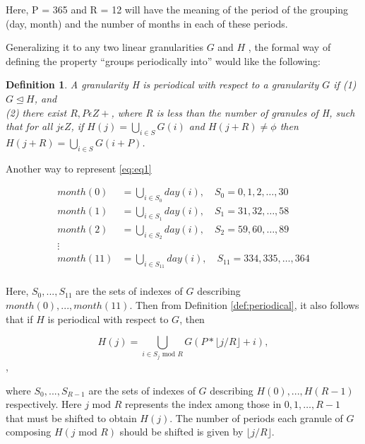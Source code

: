 \documentclass[10pt,a4paper,]{article}
\begin{document}
Here, P = 365 and R = 12 will have the meaning of the period of the grouping (day, month) and the number of months in each of these periods.

Generalizing it to any two linear granularities \(G\) and \(H\) , the formal way of defining the property \enquote{groups periodically into} would like the following:

\newtheorem{definition}{Definition}
\begin{definition}\label{def:periodical}
A granularity H is periodical with respect to a granularity $G$ if
(1) $G \trianglelefteq H$, and \\
(2) there exist $R,P \epsilon Z+$, where R is less than the number of granules of H, such
that for all $j \epsilon Z$, if $H(j) = \bigcup_{i \in S}G(i)$ and $H (j + R) \neq \phi$ then
$H (j + R) = \bigcup_{i \in S} G(i + P)$.
\end{definition}

Another way to represent \autoref{eq:eq1}

\begin{equation}\label{eq:eq3}
\begin{split}
month(0) & = \bigcup_{i \in S_0}day(i), \quad S_0 = {0, 1, 2, \dots, 30}\\
month(1) & = \bigcup_{i \in S_1}day(i), \quad S_1 = {31, 32, \dots, 58}\\
month(2) & = \bigcup_{i \in S_2}day(i), \quad S_2 = {59, 60, \dots, 89}\\
\vdots\\
month(11) &  = \bigcup_{i \in S_{11}}day(i), \quad S_{11} = {334, 335, \dots, 364}\\
\end{split}
\end{equation}

Here, \({S_0,...,S_{11}}\) are the sets of indexes of \(G\) describing \(month(0), . . . , month(11)\). Then from Definition \autoref{def:periodical}, it also follows that if \(H\) is periodical with respect to \(G\), then

\begin{equation}\label{eq:eq4}
H(j) = \bigcup_{i \in S_j \text{~mod~}R}G(P*\lfloor j/R \rfloor + i), 
\end{equation},

where \({S_0,...,S_{R-1}}\) are the sets of indexes of \(G\) describing \(H (0), . . . , H (R - 1)\) respectively. Here \(j \text{~mod~}R\) represents the index among those in \({0, 1, \dots, R-1}\) that must be shifted to obtain \(H(j)\). The number of periods each granule of \(G\) composing \(H(j \text{~mod~}R)\) should be shifted is given by \(\lfloor j/R\rfloor\).
\end{document}
